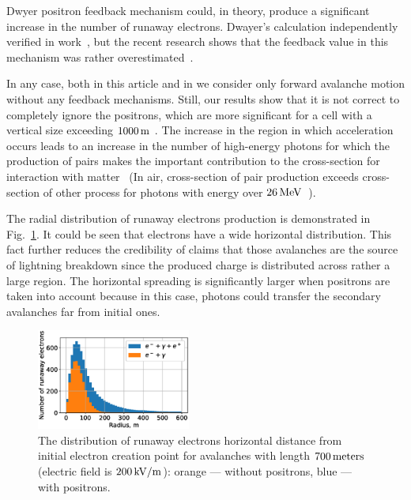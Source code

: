 \documentclass[doublecol,linenumbers]{epl2} %
\begin{document}
	Dwyer positron feedback mechanism \cite{Dwyer2012feedback} could, in theory, produce a significant increase in the number of runaway electrons. Dwayer's calculation independently verified in work~\cite{skeltved2014}, but the recent research shows that the feedback value in this mechanism was rather overestimated~\cite{npmdwyer}.
	
	In any case, both in this article and in \cite{Oreshkin_2018} we consider only forward avalanche motion without any feedback mechanisms. Still, our results show that it is not correct to completely ignore the positrons, which are more significant for a cell with a vertical size exceeding $1000\un{m}$ . The increase in the region in which acceleration occurs leads to an increase in the number of high-energy photons for which the production of pairs makes the important contribution to the cross-section for interaction with matter~\cite{heitler1984quantum, Geant2016} (In air, cross-section of pair production exceeds cross-section of other process for photons with energy over $26~\un{MeV}$~\cite{xcom}).
	
	The radial distribution of runaway electrons production is demonstrated in Fig.~\ref{fig:rad}. It could be seen that electrons have a wide horizontal distribution. This fact further reduces the credibility of claims that those avalanches are the source of lightning breakdown since the produced charge is distributed across rather a large region. The horizontal spreading is significantly larger when positrons are taken into account because in this case, photons could transfer the secondary avalanches far from initial ones.
	
	\begin{figure}[h]
		\centering
		\includegraphics[width=0.45\textwidth]{figures/radial.eps}
		\caption{The distribution of runaway electrons horizontal distance from initial electron creation point for avalanches with length $700\un{meters}$ (electric field is $200\un{kV/m}$): orange --- without positrons, blue --- with positrons. }
		\label{fig:rad}
	\end{figure}
	
\end{document}
